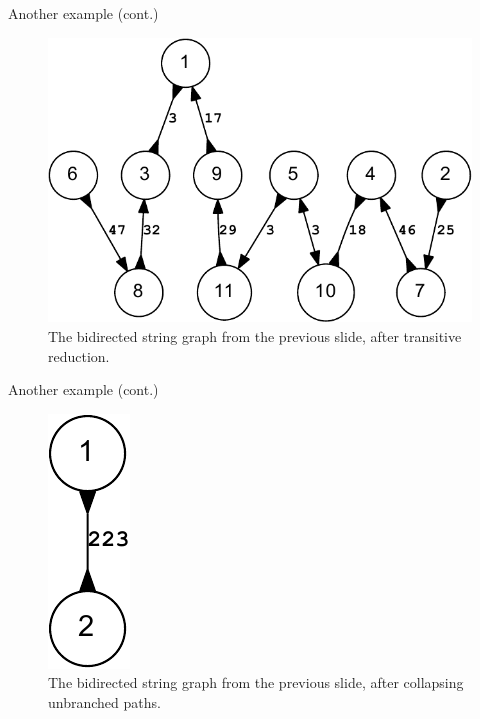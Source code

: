 \documentclass[xcolor=dvipsnames]{beamer}
\begin{document}
\begin{frame}{Another example (cont.)}
	\begin{figure}[H]
		\includegraphics[scale=0.7]{example.reduced.mapped.bidigraph-crop.pdf}	
		\caption{The bidirected string graph from the previous slide, after
		transitive reduction.}
	\end{figure}
\end{frame}

\begin{frame}{Another example (cont.)}
	\begin{figure}[H]
		\includegraphics[scale=0.7]{example.reduced.mapped.collapsed.bidigraph-crop.pdf}	
		\caption{The bidirected string graph from the previous slide, after
		collapsing unbranched paths.}
	\end{figure}
\end{frame}
\end{document}
